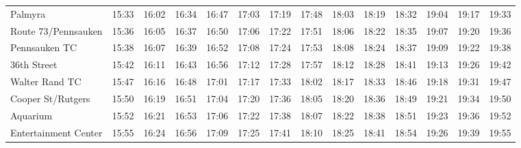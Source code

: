 \begin{center}
\begin{tabular}{@{}lrrrrrrrrrrrrr@{}}
Palmyra & 15:33 & 16:02 & 16:34 & 16:47 & 17:03 & 17:19 & 17:48 & 18:03 & 18:19 & 18:32 & 19:04 & 19:17 & 19:33 \\
Route 73/Pennsauken & 15:36 & 16:05 & 16:37 & 16:50 & 17:06 & 17:22 & 17:51 & 18:06 & 18:22 & 18:35 & 19:07 & 19:20 & 19:36 \\
Pennsauken TC & 15:38 & 16:07 & 16:39 & 16:52 & 17:08 & 17:24 & 17:53 & 18:08 & 18:24 & 18:37 & 19:09 & 19:22 & 19:38 \\
36th Street & 15:42 & 16:11 & 16:43 & 16:56 & 17:12 & 17:28 & 17:57 & 18:12 & 18:28 & 18:41 & 19:13 & 19:26 & 19:42 \\
Walter Rand TC & 15:47 & 16:16 & 16:48 & 17:01 & 17:17 & 17:33 & 18:02 & 18:17 & 18:33 & 18:46 & 19:18 & 19:31 & 19:47 \\
Cooper St/Rutgers & 15:50 & 16:19 & 16:51 & 17:04 & 17:20 & 17:36 & 18:05 & 18:20 & 18:36 & 18:49 & 19:21 & 19:34 & 19:50 \\
Aquarium & 15:52 & 16:21 & 16:53 & 17:06 & 17:22 & 17:38 & 18:07 & 18:22 & 18:38 & 18:51 & 19:23 & 19:36 & 19:52 \\
Entertainment Center & 15:55 & 16:24 & 16:56 & 17:09 & 17:25 & 17:41 & 18:10 & 18:25 & 18:41 & 18:54 & 19:26 & 19:39 & 19:55 \\
\bottomrule\end{tabular}\end{center}
